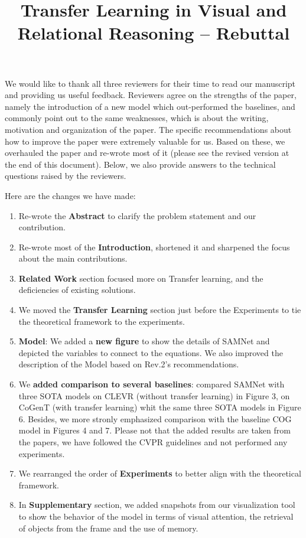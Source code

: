 \documentclass[10pt,twocolumn,letterpaper]{article}
\begin{document}
\title{Transfer Learning in Visual and Relational Reasoning -- Rebuttal}
\maketitle
\thispagestyle{empty}

We would like to thank all three reviewers for their time to read our manuscript and providing us useful feedback.  Reviewers agree on the strengths of the paper, namely the introduction of a new model which out-performed the baselines, and commonly point out to the same weaknesses, which is about the writing, motivation and organization of the paper.   The specific recommendations about how to improve the paper were extremely valuable for us.  Based on these, we overhauled the paper and re-wrote most of it (please see the revised version at the end of this document).    Below, we also provide answers to the technical questions raised by the reviewers.

Here are the changes we have made:
\begin{enumerate}
	\item Re-wrote the \textbf{Abstract} to clarify the problem statement and our contribution.
	\item Re-wrote most of the \textbf{Introduction}, shortened it and sharpened the focus about the main contributions.
	\item \textbf{Related Work} section focused more on Transfer learning, and the deficiencies of existing solutions.
	\item We moved the \textbf{Transfer Learning} section just before the Experiments to tie the theoretical framework to the experiments.
	\item \textbf{Model}:  We added a \textbf{new figure} to show the details of SAMNet and depicted the variables to connect to the equations.  We also improved the description of the Model based on Rev.2's recommendations.
	\item We \textbf{added comparison to several baselines}: compared SAMNet with three SOTA models on CLEVR (without transfer learning) in Figure 3, on CoGenT (with transfer learning) whit the same three SOTA models in Figure 6. Besides, we more stronly emphasized comparison with the baseline COG model in Figures 4 and 7. Please not that the added results are taken from the papers, we have followed the CVPR guidelines and not performed any experiments.
	\item We rearranged the order of \textbf{Experiments} to better align with the theoretical framework.
	\item In \textbf{Supplementary} section, we added snapshots from our visualization tool to show the behavior of the model in terms of visual attention, the retrieval of objects from the frame and the use of memory.
\end{enumerate}
\end{document}
